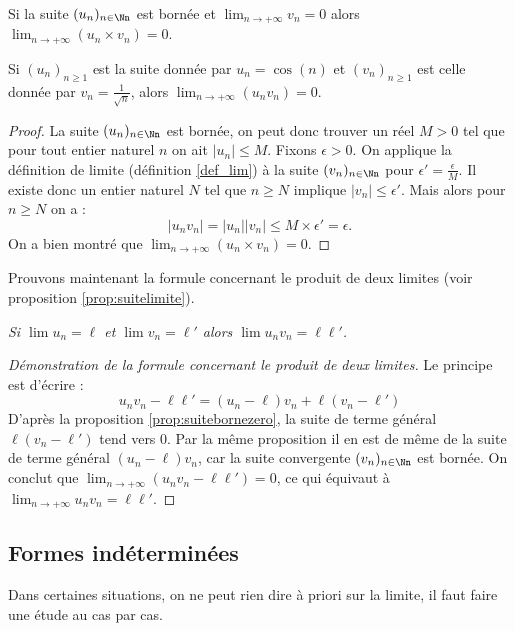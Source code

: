 \documentclass[class=report,crop=false]{standalone}
\begin{document}
\begin{proposition}
\label{prop:suitebornezero}
Si la suite $(u_n)_{n\in \Nn}$ est bornée et $\lim_{n\to +\infty}v_n=0$ alors $\lim_{n\to +\infty}\left(u_n\times v_n\right)=0$.
\end{proposition}

\begin{exemple}
 Si $(u_n)_{n\geq1}$ est la suite donnée par $u_n=\cos(n)$ et
$(v_n)_{n\geq1}$ est celle donnée par $v_n=\frac{1}{\sqrt{n}}$, alors $\lim_{n\to +\infty}\left(u_nv_n\right)=0$.
\end{exemple}

\begin{proof}
La suite $(u_n)_{n\in \Nn}$ est bornée, on peut donc trouver un réel $M>0$ tel que pour tout
entier naturel $n$ on ait $\lvert u_n \rvert\leq M$. Fixons $\epsilon >0$. On applique la
définition de limite (définition \ref{def_lim}) à la suite $(v_n)_{n\in \Nn}$ pour
$\epsilon'=\frac{\epsilon}{M}$.  Il existe donc un entier naturel $N$ tel que
$n\geq N$ implique $ \lvert v_n  \rvert\leq  \epsilon'$. Mais alors pour $n\geq N$ on a :
\[ \lvert u_nv_n \rvert= \lvert u_n \rvert \lvert v_n \rvert \leq M\times \epsilon'=\epsilon .\]
On a bien montré que $\lim_{n\to +\infty}\left(u_n\times v_n\right)=0$.
\end{proof}

\bigskip

Prouvons maintenant la formule concernant le produit de deux limites (voir proposition \ref{prop:suitelimite}).

\medskip

\centerline{\og \emph{Si \quad $\lim u_n = \ell$ \quad et \quad $\lim v_n = \ell'$ 
\quad alors \quad $\lim u_n v_n = \ell \ell'$.} \fg{}}

\begin{proof}[Démonstration de la formule concernant le produit de deux limites]
Le principe est d'écrire :
  \[
    u_nv_n-\ell\ell'=(u_n-\ell)v_n+\ell(v_n-\ell')
  \]
D'après la proposition \ref{prop:suitebornezero}, la suite de terme général $\ell(v_n-\ell')$ tend vers $0$.
Par la même proposition il en est
de même de la suite de terme général $(u_n-\ell)v_n$, car la suite convergente $(v_n)_{n\in \Nn}$
est bornée. On conclut que $\lim_{n\to +\infty} (u_nv_n-\ell\ell')=0$, ce qui équivaut à $\lim_{n\to +\infty} u_nv_n=\ell\ell'$.
\end{proof}



\subsection{Formes indéterminées}
Dans certaines situations, on ne peut rien dire à priori sur la limite,
il faut faire une étude au cas par cas.
\end{document}
